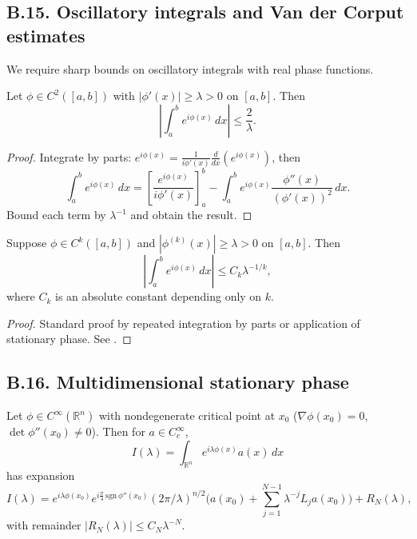 \subsection*{B.15. Oscillatory integrals and Van der Corput estimates}
\label{appB:oscint}

We require sharp bounds on oscillatory integrals with real phase functions.

\begin{lemma}[Van der Corput, $k=1$]
\label{lem:vdC1}
Let $\phi\in C^2([a,b])$ with $|\phi'(x)|\ge \lambda >0$ on $[a,b]$. Then
\[
\left|\int_a^b e^{i\phi(x)}\,dx\right| \le \frac{2}{\lambda}.
\]
\end{lemma}

\begin{proof}
Integrate by parts: $e^{i\phi(x)} = \frac{1}{i\phi'(x)} \frac{d}{dx}(e^{i\phi(x)})$, then
\[
\int_a^b e^{i\phi(x)}\,dx = \left[ \frac{e^{i\phi(x)}}{i\phi'(x)} \right]_a^b - \int_a^b e^{i\phi(x)} \frac{\phi''(x)}{(\phi'(x))^2}\, dx.
\]
Bound each term by $\lambda^{-1}$ and obtain the result.
\end{proof}

\begin{lemma}
\label{lem:vdCk}
Suppose $\phi\in C^k([a,b])$ and $|\phi^{(k)}(x)|\ge \lambda >0$ on $[a,b]$. Then
\[
\left|\int_a^b e^{i\phi(x)}\, dx\right| \le C_k \lambda^{-1/k},
\]
where $C_k$ is an absolute constant depending only on $k$.
\end{lemma}

\begin{proof}
Standard proof by repeated integration by parts or application of stationary phase. See \cite[Thm.~VIII.2.2]{Stein93}.
\end{proof}

\subsection*{B.16. Multidimensional stationary phase}
\label{appB:stationary}

\begin{theorem}
\label{thm:stationaryPhase}
Let $\phi\in C^\infty(\mathbb{R}^n)$ with nondegenerate critical point at $x_0$ ($\nabla \phi(x_0)=0$, $\det \phi''(x_0)\neq 0$). Then for $a\in C_c^\infty$,
\[
I(\lambda) = \int_{\mathbb{R}^n} e^{i\lambda \phi(x)} a(x)\, dx
\]
has expansion
\[
I(\lambda) = e^{i\lambda \phi(x_0)} e^{i\frac{\pi}{4}\,\mathrm{sgn}\,\phi''(x_0)} (2\pi/\lambda)^{n/2}
\Big(a(x_0)+\sum_{j=1}^{N-1}\lambda^{-j} L_j a(x_0)\Big) + R_N(\lambda),
\]
with remainder $|R_N(\lambda)| \le C_N \lambda^{-N}$.
\end{theorem}

